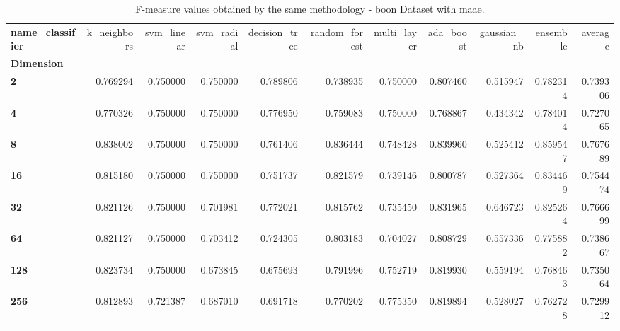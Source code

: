 \begin{table}
\centering
\caption{F-measure values obtained by the same methodology - boon Dataset with maae.}
\label{f-measure_boon_maae-reproduction}
\begin{tabular}{lrrrrrrrrrr}
\toprule
\textbf{name\_classifier} &  k\_neighbors &  svm\_linear &  svm\_radial &  decision\_tree &  random\_forest &  multi\_layer &  ada\_boost &  gaussian\_nb &  ensemble &   average \\
\textbf{Dimension} &              &             &             &                &                &              &            &              &           &           \\
\midrule
\textbf{2        } &     0.769294 &    0.750000 &    0.750000 &       0.789806 &       0.738935 &     0.750000 &   0.807460 &     0.515947 &  0.782314 &  0.739306 \\
\textbf{4        } &     0.770326 &    0.750000 &    0.750000 &       0.776950 &       0.759083 &     0.750000 &   0.768867 &     0.434342 &  0.784014 &  0.727065 \\
\textbf{8        } &     0.838002 &    0.750000 &    0.750000 &       0.761406 &       0.836444 &     0.748428 &   0.839960 &     0.525412 &  0.859547 &  0.767689 \\
\textbf{16       } &     0.815180 &    0.750000 &    0.750000 &       0.751737 &       0.821579 &     0.739146 &   0.800787 &     0.527364 &  0.834469 &  0.754474 \\
\textbf{32       } &     0.821126 &    0.750000 &    0.701981 &       0.772021 &       0.815762 &     0.735450 &   0.831965 &     0.646723 &  0.825264 &  0.766699 \\
\textbf{64       } &     0.821127 &    0.750000 &    0.703412 &       0.724305 &       0.803183 &     0.704027 &   0.808729 &     0.557336 &  0.775882 &  0.738667 \\
\textbf{128      } &     0.823734 &    0.750000 &    0.673845 &       0.675693 &       0.791996 &     0.752719 &   0.819930 &     0.559194 &  0.768463 &  0.735064 \\
\textbf{256      } &     0.812893 &    0.721387 &    0.687010 &       0.691718 &       0.770202 &     0.775350 &   0.819894 &     0.528027 &  0.762728 &  0.729912 \\
\bottomrule
\end{tabular}
\end{table}

